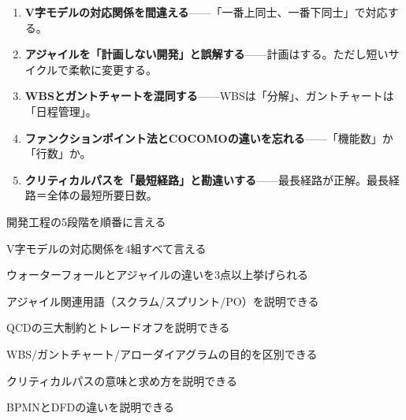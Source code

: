 \begin{yokumiss}[この章でよくあるミス]
\begin{enumerate}[leftmargin=1.6em, itemsep=5pt]
  \item \textbf{V字モデルの対応関係を間違える}——「一番上同士、一番下同士」で対応する。
  \item \textbf{アジャイルを「計画しない開発」と誤解する}——計画はする。ただし短いサイクルで柔軟に変更する。
  \item \textbf{WBSとガントチャートを混同する}——WBSは「分解」、ガントチャートは「日程管理」。
  \item \textbf{ファンクションポイント法とCOCOMOの違いを忘れる}——「機能数」か「行数」か。
  \item \textbf{クリティカルパスを「最短経路」と勘違いする}——最長経路が正解。最長経路＝全体の最短所要日数。
\end{enumerate}
\end{yokumiss}

\begin{tatsaku}
  \item 開発工程の5段階を順番に言える
  \item V字モデルの対応関係を4組すべて言える
  \item ウォーターフォールとアジャイルの違いを3点以上挙げられる
  \item アジャイル関連用語（スクラム/スプリント/PO）を説明できる
  \item QCDの三大制約とトレードオフを説明できる
  \item WBS/ガントチャート/アローダイアグラムの目的を区別できる
  \item クリティカルパスの意味と求め方を説明できる
  \item BPMNとDFDの違いを説明できる
\end{tatsaku}

